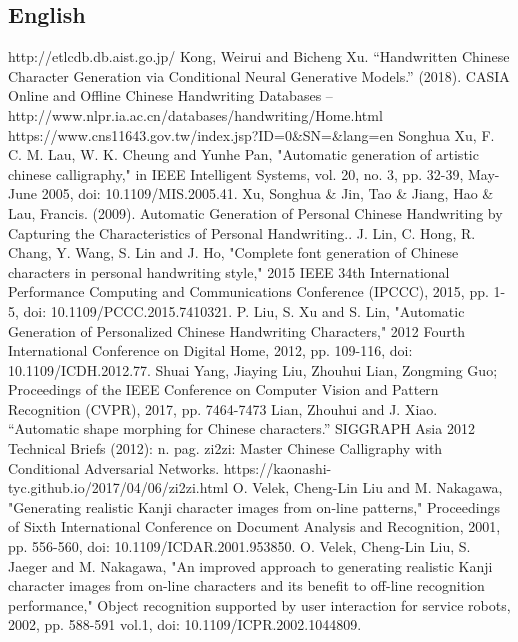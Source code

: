 \documentclass[12pt]{report}
\begin{document}
\begin{thebibliography}{9}
\section*{English}
	 http://etlcdb.db.aist.go.jp/
	 Kong, Weirui and Bicheng Xu. “Handwritten Chinese Character Generation via Conditional Neural Generative Models.” (2018).
	 CASIA Online and Offline Chinese Handwriting Databases – http://www.nlpr.ia.ac.cn/databases/handwriting/Home.html
	 https://www.cns11643.gov.tw/index.jsp?ID=0\&SN=\&lang=en
	 Songhua Xu, F. C. M. Lau, W. K. Cheung and Yunhe Pan, "Automatic generation of artistic chinese calligraphy," in IEEE Intelligent Systems, vol. 20, no. 3, pp. 32-39, May-June 2005, doi: 10.1109/MIS.2005.41.
	 Xu, Songhua \& Jin, Tao \& Jiang, Hao \& Lau, Francis. (2009). Automatic Generation of Personal Chinese Handwriting by Capturing the Characteristics of Personal Handwriting.. 
	 J. Lin, C. Hong, R. Chang, Y. Wang, S. Lin and J. Ho, "Complete font generation of Chinese characters in personal handwriting style," 2015 IEEE 34th International Performance Computing and Communications Conference (IPCCC), 2015, pp. 1-5, doi: 10.1109/PCCC.2015.7410321.
	 P. Liu, S. Xu and S. Lin, "Automatic Generation of Personalized Chinese Handwriting Characters," 2012 Fourth International Conference on Digital Home, 2012, pp. 109-116, doi: 10.1109/ICDH.2012.77.
	Shuai Yang, Jiaying Liu, Zhouhui Lian, Zongming Guo; Proceedings of the IEEE Conference on Computer Vision and Pattern Recognition (CVPR), 2017, pp. 7464-7473 
	 Lian, Zhouhui and J. Xiao. “Automatic shape morphing for Chinese characters.” SIGGRAPH Asia 2012 Technical Briefs (2012): n. pag.
	 zi2zi: Master Chinese Calligraphy with Conditional Adversarial Networks. https://kaonashi-tyc.github.io/2017/04/06/zi2zi.html
	 O. Velek, Cheng-Lin Liu and M. Nakagawa, "Generating realistic Kanji character images from on-line patterns," Proceedings of Sixth International Conference on Document Analysis and Recognition, 2001, pp. 556-560, doi: 10.1109/ICDAR.2001.953850.
	 O. Velek, Cheng-Lin Liu, S. Jaeger and M. Nakagawa, "An improved approach to generating realistic Kanji character images from on-line characters and its benefit to off-line recognition performance," Object recognition supported by user interaction for service robots, 2002, pp. 588-591 vol.1, doi: 10.1109/ICPR.2002.1044809.

\end{thebibliography}
\end{document}
